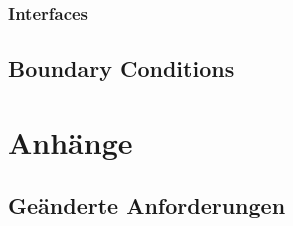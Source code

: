 \documentclass[12pt]{article} %
\begin{document}
\subsubsection{Interfaces}
\label{sec:interfaces}



\subsection{Boundary Conditions}





\section{Anhänge}

\subsection{Geänderte Anforderungen}


\end{document}
